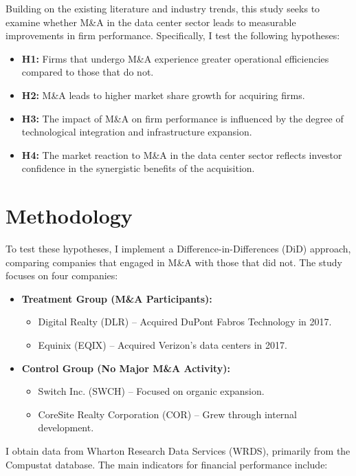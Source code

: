 \documentclass{article}
\begin{document}
Building on the existing literature and industry trends, this study seeks to examine whether M\&A in the data center sector leads to measurable improvements in firm performance. Specifically, I test the following hypotheses:

\begin{itemize}
    \item \textbf{H1:} Firms that undergo M\&A experience greater operational efficiencies compared to those that do not.
    \item \textbf{H2:} M\&A leads to higher market share growth for acquiring firms.
    \item \textbf{H3:} The impact of M\&A on firm performance is influenced by the degree of technological integration and infrastructure expansion.
    \item \textbf{H4:} The market reaction to M\&A in the data center sector reflects investor confidence in the synergistic benefits of the acquisition.
\end{itemize}

\section{Methodology}

To test these hypotheses, I implement a Difference-in-Differences (DiD) approach, comparing companies that engaged in M\&A with those that did not. The study focuses on four companies:

\begin{itemize}
    \item \textbf{Treatment Group (M\&A Participants):}
    \begin{itemize}
        \item Digital Realty (DLR) – Acquired DuPont Fabros Technology in 2017.
        \item Equinix (EQIX) – Acquired Verizon’s data centers in 2017.
    \end{itemize}
    \item \textbf{Control Group (No Major M\&A Activity):}
    \begin{itemize}
        \item Switch Inc. (SWCH) – Focused on organic expansion.
        \item CoreSite Realty Corporation (COR) – Grew through internal development.
    \end{itemize}
\end{itemize}

I obtain data from Wharton Research Data Services (WRDS), primarily from the Compustat database. The main indicators for financial performance include:
\end{document}
